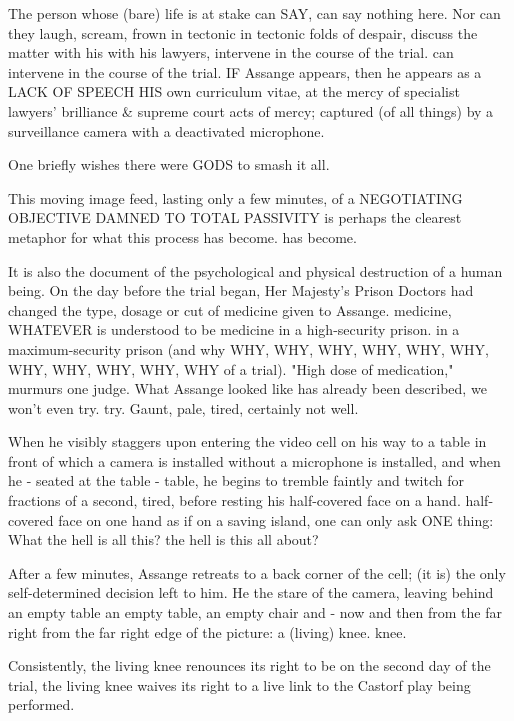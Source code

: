 \begin{multicols}{2}
The person whose (bare) life is at stake can SAY,
can say nothing here. Nor can they laugh, scream, frown in tectonic
in tectonic folds of despair, discuss the matter with his
with his lawyers, intervene in the course of the trial.
can intervene in the course of the trial. IF
Assange appears, then he appears as a LACK OF SPEECH
HIS own curriculum vitae, at the mercy of specialist lawyers' brilliance \& supreme court acts of mercy; 
captured (of all things) by a surveillance camera with a deactivated microphone.

One briefly wishes there were GODS to smash it all.

This moving image feed, lasting only a few minutes, of a NEGOTIATING OBJECTIVE DAMNED TO TOTAL PASSIVITY is perhaps the clearest
metaphor for what this process has become.
has become.

It is also the document of the psychological and physical destruction of a human being. On the day before the trial began, Her Majesty's Prison Doctors had
changed the type, dosage or cut of medicine given to Assange.
medicine, WHATEVER is understood to be medicine in a high-security prison.
in a maximum-security prison (and why
WHY, WHY, WHY, WHY, WHY, WHY, WHY, WHY, WHY, WHY, WHY
of a trial). "High dose of medication," murmurs one judge. What Assange looked like has
already been described, we won't even try.
try. Gaunt, pale, tired, certainly not well.

When he visibly staggers upon entering the video cell on his way to a table in front of which a camera is installed without a
microphone is installed, and when he - seated at the table
- table, he begins to tremble faintly and twitch for fractions of a second, tired, before resting his half-covered face on a hand.
half-covered face on one hand as if on a saving island, one can only ask ONE thing: What the hell is all this?
the hell is this all about?

After a few minutes, Assange retreats to a back corner of the cell; (it is) the only self-determined decision left to him. He
the stare of the camera, leaving behind an empty table
an empty table, an empty chair and - now and then from the far right
from the far right edge of the picture: a (living) knee.
knee.

Consistently, the living knee renounces its right to be
on the second day of the trial, the living knee waives its right to a live link to the Castorf play being performed.



\end{multicols}
